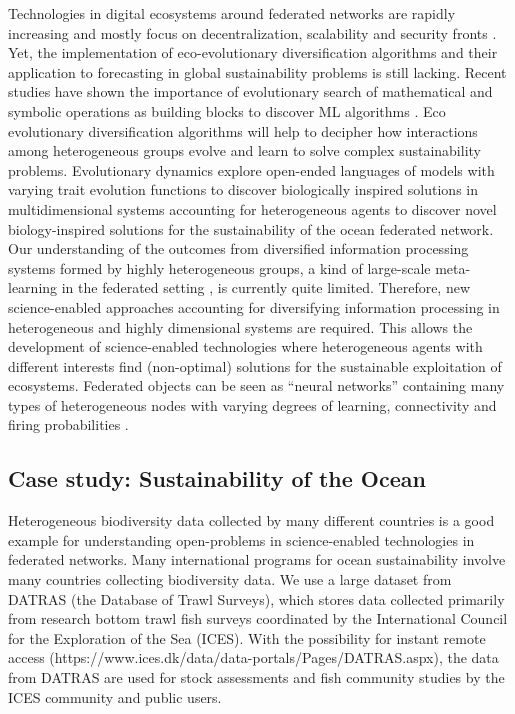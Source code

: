 \documentclass[12pt,a4paper]{article}
\begin{document}
Technologies in digital ecosystems around federated networks are rapidly increasing and mostly focus on decentralization, scalability and security fronts \cite{Androulaki2018,OceanProtocolFoundation2018,BigchainDBGmbH2018}. Yet, the implementation of eco-evolutionary diversification algorithms and their application to forecasting in global sustainability problems is still lacking. Recent studies have shown the importance of evolutionary search of mathematical and symbolic operations as building blocks to discover ML algorithms \citep{Real2020,Guimera2020}. Eco evolutionary diversification algorithms will help to decipher how interactions among heterogeneous groups evolve and learn to solve complex sustainability problems. Evolutionary dynamics explore open-ended languages of models with varying trait evolution functions to discover biologically inspired solutions in multidimensional systems \citep{Real2020} accounting for heterogeneous agents to discover novel biology-inspired solutions for the sustainability of the ocean federated network. Our understanding of the outcomes from diversified information processing systems formed by highly heterogeneous groups, a kind of large-scale meta-learning in the federated setting \citep{Dilley2016}, is currently quite limited. Therefore, new science-enabled approaches accounting for diversifying information processing in heterogeneous and highly dimensional systems are required. This allows the development of science-enabled technologies where heterogeneous agents with different interests find (non-optimal) solutions for the sustainable exploitation of ecosystems. Federated objects can be seen as ``neural networks'' containing many types of heterogeneous nodes with varying degrees of learning, connectivity and firing probabilities \citep{Maass2014,Maass2015}.


\subsection{Case study: Sustainability of the Ocean}

Heterogeneous biodiversity data collected by many different countries is a good example for understanding open-problems in science-enabled technologies in federated networks. Many international programs for ocean sustainability involve many countries collecting biodiversity data. We use a large dataset from DATRAS (the Database of Trawl Surveys), which stores data collected primarily from research bottom trawl fish surveys coordinated by the International Council for the Exploration of the Sea (ICES). With the possibility for instant remote access (https://www.ices.dk/data/data-portals/Pages/DATRAS.aspx), the data from DATRAS are used for stock assessments and fish community studies by the ICES community and public users. 
\end{document}
